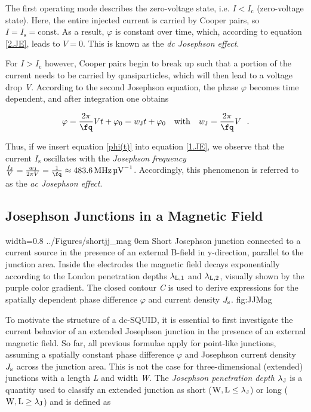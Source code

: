 The first operating mode describes the zero-voltage state, i.e.  $I<I_\mathrm{c}$ (zero-voltage state). Here, the entire injected current is carried by Cooper pairs, so $I=I_\mathrm{s}=\mathrm{const}$. As a result, $\varphi$ is constant over time, which, according to equation \eqref{2.JE}, leads to $V=0$. This is known as the \textit{dc Josephson effect}.

For $I>I_\mathrm{c}$ however, Cooper pairs begin to break up such that a portion of the current needs to be carried by quasiparticles, which will then lead to a voltage drop \textit{V}. According to the second Josephson equation, the phase $\varphi$ becomes time dependent, and after integration one obtains

\begin{equation}
\label{phi(t)}
\varphi = \frac{2\pi}{\unit{\fq}}Vt + \varphi_0 = w_\mathrm{J}t + \varphi_0 \ \ \ \mathrm{with} \ \ \ w_\mathrm{J} = \frac{2\pi}{\unit{\fq}}V \ \ .
\end{equation}

Thus, if we insert equation \eqref{phi(t)} into equation \eqref{1.JE}, we observe that  the current $I_\mathrm{s}$ oscillates with the \textit{Josephson frequency} $\frac{f_\mathrm{J}}{V} = \frac{w_\mathrm{J}}{2\pi V} = \frac{1}{\unit{\fq}} \approx \SI{483.6}{\MHz\per\uV}$. Accordingly, this phenomenon is referred to as the \textit{ac Josephson effect}.



\subsection{Josephson Junctions in a Magnetic Field}\label{subsec_jjmag}

{width=0.8\textwidth}
{../Figures/shortjj_mag}
{0cm}
{Short Josephson junction connected to a current source in the presence of an external B-field in y-direction, parallel to the junction area. Inside the electrodes the magnetic field decays exponentially according to the London penetration depths $\lambda_{\rm L,1}$ and $\lambda_{\rm L,2}$, visually shown by the purple color gradient. The closed contour \textit{C} is used to derive expressions for the spatially dependent phase difference $\varphi$ and current density $J_{\rm s}$.} 
{fig:JJMag}

To motivate the structure of a dc-SQUID, it is essential to first investigate the current behavior of an extended Josephson junction in the presence of an external magnetic field. So far, all previous formulae apply for point-like junctions, assuming a spatially constant phase difference $\varphi$ and Josephson current density $J_{\rm s}$ across the junction area. This is not the case for three-dimensional (extended) junctions with a length \textit{L} and width \textit{W}. The \textit{Josephson penetration depth} $\lambda_{\rm J}$ is a quantity used to classify an extended junction as short ($\rm W,L \leq\lambda_{\rm J}$) or long ($\rm W,L \geq\lambda_{\rm J}$) and is defined as 

